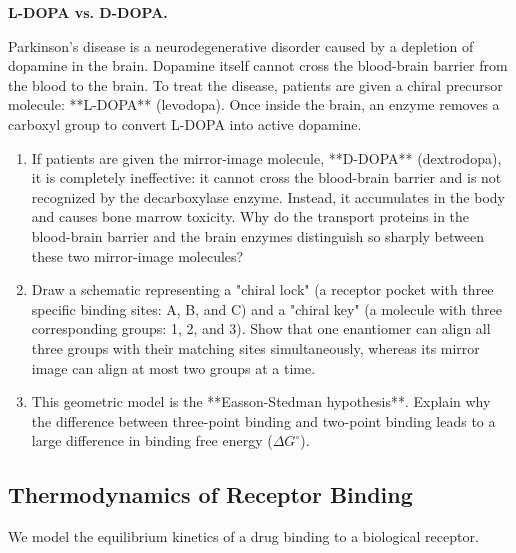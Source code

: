 \documentclass[12pt, a4paper]{book}
\begin{document}
\begin{puzzlebox}
\textbf{L-DOPA vs. D-DOPA.}

Parkinson's disease is a neurodegenerative disorder caused by a depletion of dopamine in the brain. Dopamine itself cannot cross the blood-brain barrier from the blood to the brain.
To treat the disease, patients are given a chiral precursor molecule: **L-DOPA** (levodopa). Once inside the brain, an enzyme removes a carboxyl group to convert L-DOPA into active dopamine.
\begin{enumerate}[label=(\alph*), leftmargin=*]
  \item If patients are given the mirror-image molecule, **D-DOPA** (dextrodopa), it is completely ineffective: it cannot cross the blood-brain barrier and is not recognized by the decarboxylase enzyme. Instead, it accumulates in the body and causes bone marrow toxicity.
        Why do the transport proteins in the blood-brain barrier and the brain enzymes distinguish so sharply between these two mirror-image molecules?
  \item Draw a schematic representing a "chiral lock" (a receptor pocket with three specific binding sites: A, B, and C) and a "chiral key" (a molecule with three corresponding groups: 1, 2, and 3).
        Show that one enantiomer can align all three groups with their matching sites simultaneously, whereas its mirror image can align at most two groups at a time.
  \item This geometric model is the **Easson-Stedman hypothesis**. Explain why the difference between three-point binding and two-point binding leads to a large difference in binding free energy ($\Delta G^\circ$).
\end{enumerate}
\end{puzzlebox}

\subsection{Thermodynamics of Receptor Binding}

We model the equilibrium kinetics of a drug binding to a biological receptor.
\end{document}

